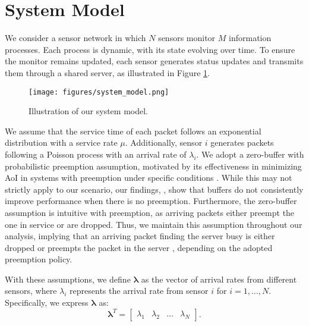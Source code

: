 \section{System Model}\label{system-model}

We consider a sensor network in which \(N\) sensors monitor \(M\) information processes. 
Each process is dynamic, with its state evolving over time. To ensure the monitor remains updated, each sensor generates status updates and transmits them through a shared server, as illustrated in Figure \ref{fig:system_model}. 
\begin{figure}[!t]
  \centering
  \texttt{[image: figures/system\_model.png]}
  \caption{Illustration of our system model.}
  \vspace{-14pt}\label{fig:system_model}
\end{figure}
We assume that the service time of each packet follows an exponential distribution with a service rate \(\mu\). Additionally, sensor \(i\) generates packets following a Poisson process with an arrival rate of \(\lambda_i\). We adopt a zero-buffer with probabilistic preemption assumption, motivated by its effectiveness in minimizing AoI in systems with preemption under specific conditions \cite{bedewy}. While this may not strictly apply to our scenario, our findings, \cite{erbayat2024}, show that buffers do not consistently improve performance when there is no preemption. Furthermore, the zero-buffer assumption is intuitive with preemption, as arriving packets either preempt the one in service or are dropped. Thus, we maintain this assumption throughout our analysis, implying that an arriving packet finding the server busy is either dropped or preempts the packet in the server \cite{dataNetworks:book}, depending on the adopted preemption policy.

With these assumptions, we define \(\boldsymbol{\lambda}\) as the vector of arrival rates from different sensors, where \(\lambda_i\) represents the arrival rate from sensor \(i\) for \(i=1,\ldots,N\). Specifically, we express \(\boldsymbol{\lambda}\) as:
\begin{equation}
\boldsymbol{\lambda}^T = \begin{bmatrix}
\lambda_{1} & \lambda_{2} & \dots & \lambda_{N}
\end{bmatrix}.
\end{equation}

